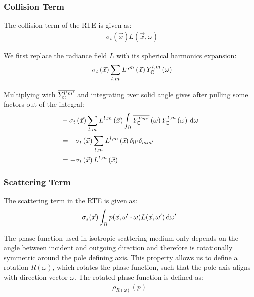 \documentclass[10pt]{scrartcl}
\begin{document}
\subsubsection{Collision Term}

The collision term of the RTE is given as:
\begin{align*}
-\sigma_t\left(\vec{x}\right)L\left(\vec{x}, \omega\right)
\end{align*}

We first replace the radiance field $L$ with its spherical harmonics expansion:
\begin{align*}
-\sigma_t\left(\vec{x}\right)
\sum_{l,m}
{
L^{l,m}\left(\vec{x}\right )Y_{\mathbb{C}}^{l,m}\left(\omega\right)
}
\end{align*}

Multiplying with $\overline{Y_{\mathbb{C}}^{l'm'}}$ and integrating over solid angle gives after pulling some factors out of the integral:
\begin{align*}
&-\sigma_t\left(\vec{x}\right)\sum_{l,m}{L^{l,m}\left(\vec{x}\right )\int_\Omega\overline{Y_{\mathbb{C}}^{l'm'}}\left(\omega\right)Y_{\mathbb{C}}^{l,m}\left(\omega\right)\,\mathrm{d}\omega}\\
&= -\sigma_t\left(\vec{x}\right)\sum_{l,m}{L^{l,m}\left(\vec{x}\right )\delta_{ll'}\delta_{mm'}}\\
&= -\sigma_t\left(\vec{x}\right)L^{l,m}\left(\vec{x}\right )
\end{align*}


\subsubsection{Scattering Term}
\label{sec:complex_scattering_term}

The scattering term in the RTE is given as:
\begin{align*}
\sigma_s(\vec{x})\int_{\Omega}p(\vec{x}, \omega'\cdot\omega)L(\vec{x}, \omega')\,\mathrm{d}\omega'
\end{align*}

The phase function used in isotropic scattering medium only depends on the angle between incident and outgoing direction and therefore is rotationally symmetric around the pole defining axis. This property allows us to define a rotation $R(\omega)$, which rotates the phase function, such that the pole axis aligns with direction vector $\omega$. The rotated phase function is defined as:
\begin{align*}
\rho_{R(\omega)}(p)
\end{align*}
\end{document}
